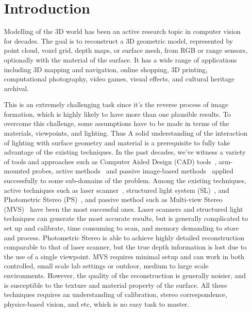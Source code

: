 
\chapter{Introduction}
\label{ch:Introduction}
Modelling of the 3D world has been an active research topic in computer vision for decades. The goal is to reconstruct a 3D geometric model, represented by point cloud, voxel grid, depth maps, or surface mesh, from RGB or range sensors, optionally with the material of the surface. It has a wide range of applications including 3D mapping and navigation, online shopping, 3D printing, computational photography, video games, visual effects, and cultural heritage archival.

This is an extremely challenging task since it's the reverse process of image formation, which is highly likely to have more than one plausible results. To overcome this challenge, some assumptions have to be made in terms of the materials, viewpoints, and lighting. Thus A solid understanding of the interaction of lighting with surface geometry and material is a prerequisite to fully take advantage of the existing techniques. In the past decades, we've witness a variety of tools and approaches such as Computer Aided Design (CAD) tools~\cite{CAD}, arm-mounted probes, active methods~\cite{bernardini2002building,levoy2000digital,Lidar,kinect} and passive image-based methods~\cite{kutulakos2000theory,furukawa2010accurate,faugeras2002variational,goesele2006multi} applied successfully to some sub-domains of the problem. Among the existing techniques, active techniques such as laser scanner~\cite{levoy2000digital}, structured light system (SL)~\cite{bernardini2002building}, and Photometric Stereo (PS)~\cite{woodham1980photometric}, and passive method such as Multi-view Stereo (MVS)~\cite{seitz2006comparison} have been the most successful ones. Laser scanners and structured light techniques can generate the most accurate results, but is generally complicated to set up and calibrate, time consuming to scan, and memory demanding to store and process. Photometric Stereo is able to achieve highly detailed reconstruction comparable to that of laser scanner, but the true depth information is lost due to the use of a single viewpoint. MVS requires minimal setup and can work in both controlled, small scale lab settings or outdoor, medium to large scale environments. However, the quality of the reconstruction is generally noisier, and is susceptible to the texture and material property of the surface. All these techniques requires an understanding of calibration, stereo correspondence, physics-based vision, and etc, which is no easy task to master.

